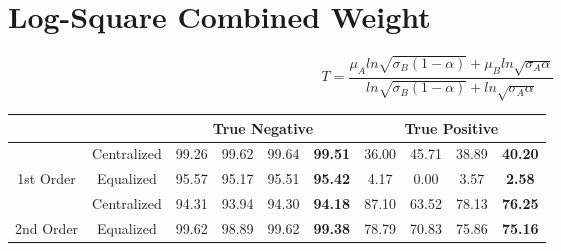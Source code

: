 \documentclass[10pt,a4paper]{article}
\begin{document}
	\section{Log-Square Combined Weight}
		$$
		T = \frac{\mu_A ln\sqrt{\sigma_B (1 - \alpha)}
			+ \mu_B ln\sqrt{\sigma_A \alpha}}
		{ln\sqrt{\sigma_B (1 - \alpha)} + ln\sqrt{\sigma_A \alpha}}
		$$
		\begin{table}[!h]
			\centering
			\begin{tabular}{|c|c|c|c|c|c|c|c|c|c|}
				\hline
				&             & \multicolumn{4}{c|}{True Negative}                            & \multicolumn{4}{c|}{True Positive}                            \\ \hline
				& Centralized & 99.26 & 99.62 & 99.64 & {\color[HTML]{FE0000} \textbf{99.51}} & 36.00 & 45.71 & 38.89 & {\color[HTML]{FE0000} \textbf{40.20}} \\ \cline{2-10} 
				\multirow{-2}{*}{1st Order} & Equalized   & 95.57 & 95.17 & 95.51 & {\color[HTML]{FE0000} \textbf{95.42}} & 4.17  & 0.00  & 3.57  & {\color[HTML]{FE0000} \textbf{2.58}}  \\ \hline
				& Centralized & 94.31 & 93.94 & 94.30 & {\color[HTML]{FE0000} \textbf{94.18}} & 87.10 & 63.52 & 78.13 & {\color[HTML]{FE0000} \textbf{76.25}} \\ \cline{2-10} 
				\multirow{-2}{*}{2nd Order} & Equalized   & 99.62 & 98.89 & 99.62 & {\color[HTML]{FE0000} \textbf{99.38}} & 78.79 & 70.83 & 75.86 & {\color[HTML]{FE0000} \textbf{75.16}} \\ \hline
			\end{tabular}
		\end{table}
	
\end{document}
